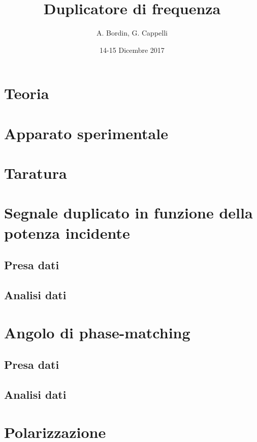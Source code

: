 \documentclass[a4paper]{article}
\author{A. Bordin, G. Cappelli}
\title{Duplicatore di frequenza}
\date{14-15 Dicembre 2017}
\begin{document}
	\maketitle
	
	\begin{abstract}
		 
	\end{abstract}
	
\section{Teoria}

\section{Apparato sperimentale}

\section{Taratura}

\section{Segnale duplicato in funzione della potenza incidente}

\subsection{Presa dati}

\subsection{Analisi dati}

\section{Angolo di phase-matching}

\subsection{Presa dati}

\subsection{Analisi dati}

\section{Polarizzazione}
\end{document}
